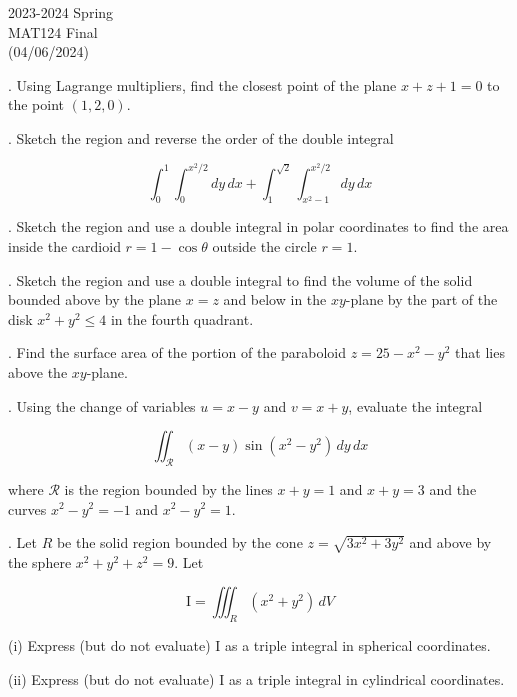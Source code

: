 \documentclass{article}
\begin{document}
\pagestyle{empty}
\large

\begin{center}
2023-2024 Spring \\MAT124 Final\\(04/06/2024)
\end{center}

. Using Lagrange multipliers, find the closest point of the plane $x+z+1=0$ to the point $(1,2,0)$.

\hfill

. Sketch the region and reverse the order of the double integral

\[
\int_0^1
\int_0^{x^2/2}dy\,dx+\int_1^{\sqrt2}\int_{x^2-1}^{x^2/2}dy\,dx\]

\hfill

. Sketch the region and use a double integral in polar coordinates to find the area inside the cardioid $r=1-\cos\theta$ outside the circle $r=1$.

\hfill

. Sketch the region and use a double integral to find the volume of the solid bounded above by the plane $x=z$ and below in the $xy$-plane by the part of the disk $x^2+y^2\leq4$ in the fourth quadrant.

\hfill

. Find the surface area of the portion of the paraboloid $z=25-x^2-y^2$ that lies above the $xy$-plane.

\hfill

. Using the change of variables $u=x-y$ and $v=x+y$, evaluate the integral

\[\iint_{\mathcal{R}}(x-y)\sin\left(x^2-y^2\right)\,dy\,dx\]

\hfill

\noindent where $\mathcal{R}$ is the region bounded by the lines $x+y=1$ and $x+y=3$ and the curves $x^2-y^2=-1$ and $x^2-y^2=1$.

\hfill

. Let $R$ be the solid region bounded by the cone $z=\sqrt{3x^2+3y^2}$ and above by the sphere $x^2+y^2+z^2=9$. Let

\[\mathrm{I}=\iiint_R\left(x^2+y^2\right)\,dV\]

\hfill

\noindent (i) Express (but do not evaluate) $\mathrm{I}$ as a triple integral in spherical coordinates.

\hfill

\noindent (ii) Express (but do not evaluate) $\mathrm{I}$ as a triple integral in cylindrical coordinates.
\end{document}
